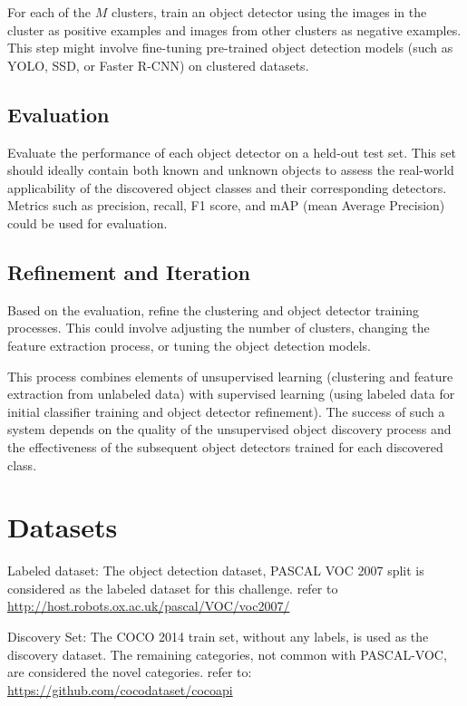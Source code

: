 \documentclass{article}
\begin{document}
	
	For each of the $M$ clusters, train an object detector using the images in the cluster as positive examples and images from other clusters as negative examples. This step might involve fine-tuning pre-trained object detection models (such as YOLO, SSD, or Faster R-CNN) on clustered datasets.
	
	\subsection{Evaluation}
	
	
	Evaluate the performance of each object detector on a held-out test set. This set should ideally contain both known and unknown objects to assess the real-world applicability of the discovered object classes and their corresponding detectors. Metrics such as precision, recall, F1 score, and mAP (mean Average Precision) could be used for evaluation.
	
	\subsection{Refinement and Iteration}
	
	
	Based on the evaluation, refine the clustering and object detector training processes. This could involve adjusting the number of clusters, changing the feature extraction process, or tuning the object detection models.
	
	This process combines elements of unsupervised learning (clustering and feature extraction from unlabeled data) with supervised learning (using labeled data for initial classifier training and object detector refinement). The success of such a system depends on the quality of the unsupervised object discovery process and the effectiveness of the subsequent object detectors trained for each discovered class.
	
	
	\section{Datasets}
	\label{datasets}
	
	
	Labeled dataset: The object detection dataset, PASCAL VOC 2007 split is considered as the labeled dataset for this challenge. refer to \url{http://host.robots.ox.ac.uk/pascal/VOC/voc2007/}
	
	Discovery Set: The COCO 2014 train set, without any labels, is used as the discovery dataset. The remaining categories, not common with PASCAL-VOC, are considered the novel categories. refer to: \url{https://github.com/cocodataset/cocoapi}
	
\end{document}
